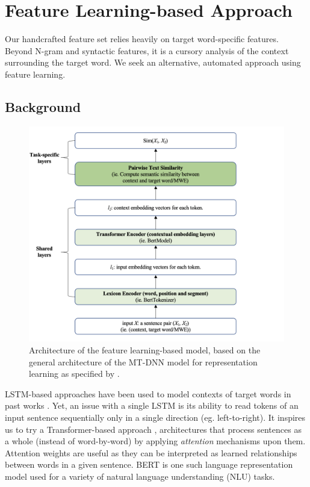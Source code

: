 \documentclass{dcthesis}
\theoremstyle{definition}
\theoremstyle{remark}
\begin{document}
\section{Feature Learning-based Approach}

Our handcrafted feature set relies heavily on target word-specific features. Beyond N-gram and syntactic features, it is a cursory analysis of the context surrounding the target word. We seek an alternative, automated approach using feature learning.

\subsection{Background}

\begin{figure}
  \centering
  \includegraphics[scale=0.75]{architecture.png}
  \caption{\label{fig:architecture} Architecture of the feature learning-based model, based on the general architecture of the MT-DNN model for representation learning as specified by \citet{liu2019multi}.}
\end{figure}

LSTM-based approaches have been used to model contexts of target words in past works \citep{hartmann2018nilc, de2018deep}. Yet, an issue with a single LSTM is its ability to read tokens of an input sentence sequentially only in a single direction (eg. left-to-right). It inspires us to try a Transformer-based approach \citep{vaswani2017attention}, architectures that process sentences as a whole (instead of word-by-word) by applying \textit{attention} mechanisms upon them. Attention weights are useful as they can be interpreted as learned relationships between words in a given sentence. BERT \citep{devlin2018bert} is one such language representation model used for a variety of natural language understanding (NLU) tasks.
\end{document}
